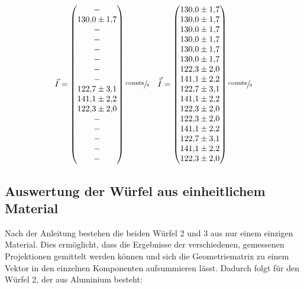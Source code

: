 \begin{equation}
	\vec{I}=
	\begin{pmatrix}
		- \\
		\num{130.0 \pm 1.7} \\
		- \\
		- \\
	  - \\
		- \\
		- \\
		- \\
		\num{122.7 \pm 3.1} \\
		\num{141.1 \pm 2.2} \\
		\num{122.3 \pm 2.0} \\
		- \\
    - \\
    - \\
    - \\
    -
	\end{pmatrix}
	\sfrac{\text{counts}}{\text{s}}\quad
	\vec{\tilde{I}}=
	\begin{pmatrix}
		\num{130.0\pm 1.7} \\
		\num{130.0\pm 1.7} \\
		\num{130.0\pm 1.7} \\
		\num{130.0\pm 1.7} \\
		\num{130.0\pm 1.7} \\
		\num{130.0\pm 1.7} \\
		\num{122.3\pm 2.0} \\
		\num{141.1\pm 2.2} \\
		\num{122.7\pm 3.1} \\
		\num{141.1\pm 2.2} \\
		\num{122.3\pm 2.0} \\
		\num{122.3\pm 2.0} \\
    \num{141.1\pm 2.2} \\
    \num{122.7\pm 3.1} \\
    \num{141.1\pm 2.2} \\
    \num{122.3\pm 2.0} \\
	\end{pmatrix}
    \sfrac{\text{counts}}{\text{s}}
	\label{eq:int}
\end{equation}

\subsection{Auswertung der Würfel aus einheitlichem Material}

Nach der Anleitung bestehen die beiden Würfel 2 und 3 aus nur einem einzigen Material. Dies ermöglicht, dass die Ergebnisse der verschiedenen,
gemessenen Projektionen gemittelt werden können und sich die Geometriematrix zu einem Vektor in den einzelnen Komponenten aufsummieren lässt.
Dadurch folgt für den Würfel 2, der aus Aluminium besteht:

